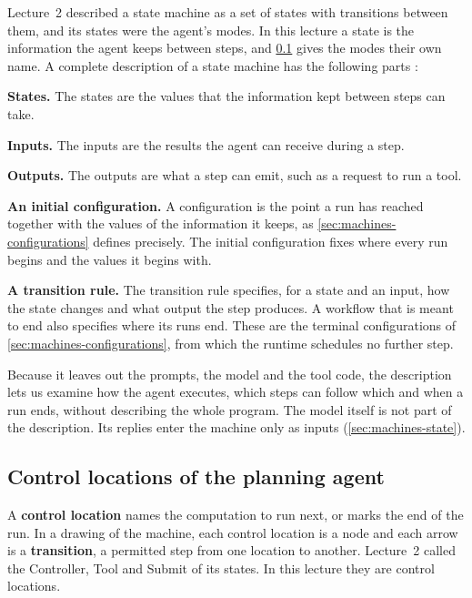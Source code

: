 Lecture~2 described a state machine as a set of states with transitions between them, and its
states were the agent's modes. In this lecture a state is the information the agent keeps between
steps, and \cref{sec:machines-locations} gives the modes their own name. A complete description of
a state machine has the following parts \citep[slide~17]{seshia2015discrete}:
\bi
\item \textbf{States.} The states are the values that the information kept between steps can take.
\item \textbf{Inputs.} The inputs are the results the agent can receive during a step.
\item \textbf{Outputs.} The outputs are what a step can emit, such as a request to run a tool.
\item \textbf{An initial configuration.} A configuration is the point a run has reached together
with the values of the information it keeps, as \cref{sec:machines-configurations} defines
precisely. The initial configuration fixes where every run begins and the values it begins with.
\item \textbf{A transition rule.} The transition rule specifies, for a state and an input, how the
state changes and what output the step produces.
\ei
A workflow that is meant to end also specifies where its runs end. These are the terminal
configurations of \cref{sec:machines-configurations}, from which the runtime schedules no further
step.

Because it leaves out the prompts, the model and the tool code, the description lets us examine how
the agent executes, which steps can follow which and when a run ends, without describing the whole
program. The model itself is not part of the description. Its replies enter the machine only as
inputs (\cref{sec:machines-state}).

\subsection{Control locations of the planning agent}
\label{sec:machines-locations}

A \textbf{control location} names the computation to run next, or marks the end of the run. In a
drawing of the machine, each control location is a node and each arrow is a \textbf{transition}, a
permitted step from one location to another. Lecture~2 called the Controller, Tool and Submit of
\msa{} its states. In this lecture they are control locations.

